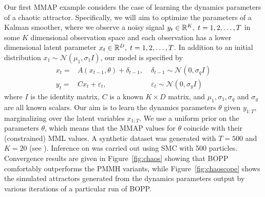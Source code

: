 Our first MMAP example considers the case of learning the dynamics parameters of a chaotic attractor.  
Specifically, we will aim to optimize the parameters of a Kalman smoother,
where we observe a noisy signal 
$y_t \in \mathbb{R}^{K}, \; t = 1,2,\dots,T$ in some $K$ dimensional observation space and each 
observation has a lower dimensional latent parameter $x_t \in \mathbb{R}^{D},  \; t = 1,2,\dots,T$.
In addition to an initial distribution $x_1 \sim \mathcal{N} \left(\mu_1, \sigma_1 I\right)$, our model is specified by 
\begin{subequations}
	\label{eq:Kalman}
\begin{align}
x_t = & A \left(x_{t-1}, \theta\right)+\delta_{t-1}, \; & \delta_{t-1} \sim \mathcal{N} \left(0, \sigma_q I\right) \\
y_t = & C x_{t}+\varepsilon_{t}, \; & \varepsilon_{t} \sim \mathcal{N} \left(0, \sigma_y I\right)
\end{align}
\end{subequations}
where $I$ is the identity matrix, $C$ is a known $K \times D$ matrix, and $\mu_1,\sigma_1, \sigma_q$ 
and $\sigma_y$ are all known scalars.  Our aim is to learn the dynamics parameters $\theta$ given
$y_{1:T}$, marginalizing over the latent variables $x_{1:T}$.  We use
a uniform prior on the parameters $\theta$, which means that the MMAP values for $\theta$
coincide with their (constrained) MML values.  A synthetic dataset was generated with $T=500$ and
$K=20$ (see \cite{rainforth2017boppArxiv}).
Inference on \qmarg was carried out using SMC with 500 particles.  
Convergence results are given in Figure~\ref{fig:chaos} showing that BOPP comfortably 
outperforms the PMMH variants, while Figure~\ref{fig:chaoscope} shows the simulated 
attractors generated from the dynamics parameters output by various iterations of a 
particular run of BOPP.
